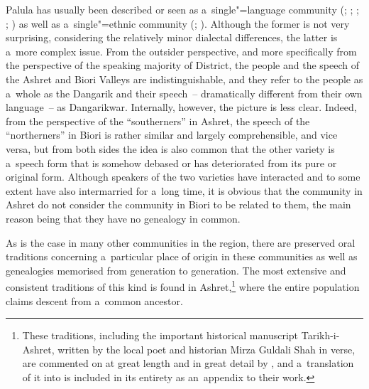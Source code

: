 Palula has usually been described or seen as a~single"=language community (\citealt[7]{morgenstierne1941}; \citealt[67]{decker1992a}; \citeyear[160]{decker1996}; \citealt[21]{masica1991}; \citealt[253, 258]{strand2001}) as well as a~single"=ethnic community (\citealt[79--143]{cacopardo2001}; \citealt[5]{akhunzadaliljegren2009}). Although the former is not very surprising, considering the relatively minor dialectal differences, the latter is a~more complex issue. From the outsider perspective, and more specifically from the perspective of the \iliKhowar speaking majority of \iliChitral District, the people and the speech of the Ashret and Biori Valleys are indistinguishable, and they refer to the people as a~whole as the Dangarik and their speech~-- dramatically different from their own language~-- as Dangarikwar. Internally, however, the picture is less clear. Indeed, from the perspective of the ``southerners'' in Ashret, the speech of the ``northerners'' in Biori is rather similar and largely comprehensible, and vice versa, but from both sides the idea is also common that the other variety is a~speech form that is somehow debased or has deteriorated from its pure or original form. Although speakers of the two varieties have interacted and to some extent have also intermarried for a~long time, it is obvious that the community in Ashret do not consider the community in Biori to be related to them, the main reason being that they have no genealogy in common. 

\largerpage[-1]
As is the case in many other communities in the region, there are preserved oral traditions concerning a~particular place of origin in these communities as well as genealogies memorised from generation to generation. The most extensive and consistent traditions of this kind is found in Ashret,\footnote{These traditions, including the important historical manuscript Tarikh-i-Ashret, written by the local poet and historian Mirza Guldali Shah in \iliPersian verse, are commented on at great length and in great detail by \citet[79--143]{cacopardo2001}, and a~translation of it into \iliEnglish is included in its entirety as an~appendix to their work.} where the entire population claims descent from a~common ancestor. 


